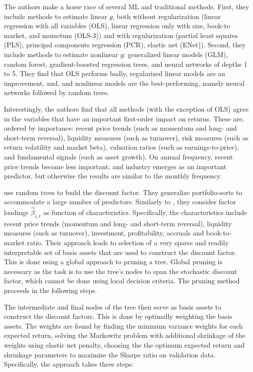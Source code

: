 		
		The authors make a horse race of several ML and traditional methods. First, they include methods to estimate linear $g$, both without regularization (linear regression with all variables (OLS), linear regression only with size, book-to market, and mometum (OLS-3)) and with regularization (partial least squares (PLS), principal components regression (PCR), elastic net (ENet)). Second, they include methods to estimate nonlinear $g$: generalized linear models (GLM), random forest, gradient-boosted regression trees, and neural networks of depths 1 to 5. They find that OLS performs badly, regularized linear models are an improvement, and, and nonlinear models are the best-performing, namely neural networks followed by random trees. 
		
		Interestingly, the authors find that all methods (with the exception of OLS) agree in the variables that have an important first-order impact on returns. These are, ordered by importance: recent price trends (such as momentum and long- and short-term reversal), liquidity measures (such as turnover), risk measures (such as return volatility and market beta), valuation ratios (such as earnings-to-price), and fundamental signals (such as asset growth). On annual frequency, recent price trends become less important, and industry emerges as an important predictor, but otherwise the results are similar to the monthly frequency.
		
		\cite{bryzgalova2019forest} use random trees to build the discount factor. They generalize portfolio-sorts to accommodate a large number of predictors. Similarly to \cite{kelly2019characteristics}, they consider factor loadings $\vec{\beta}_{i,t}$ as function of characteristics. Specifically, the characteristics include recent price trends (momentum and long- and short-term reversal), liquidity measures (such as turnover), investment, profitability, accruals and book-to-market ratio. Their approach leads to selection of a very sparse and readily interpretable set of basis assets that are used to construct the discount factor. This is done using a global approach to pruning a tree. Global pruning is necessary as the task is to use the tree's nodes to span the stochastic discount factor, which cannot be done using local decision criteria. The pruning method proceeds in the following steps. 	
		
		The intermediate and final nodes of the tree then serve as basis assets to construct the discount factors. This is done by optimally weighting the basis assets. The weights are found by finding the minimum variance weights for each expected return, solving the Markowitz problem with additional shrinkage of the weights using elastic net penalty, choosing the the optimum expected return and shrinkage parameters to maximize the Sharpe ratio on validation data. Specifically, the approach takes three steps: 
		
